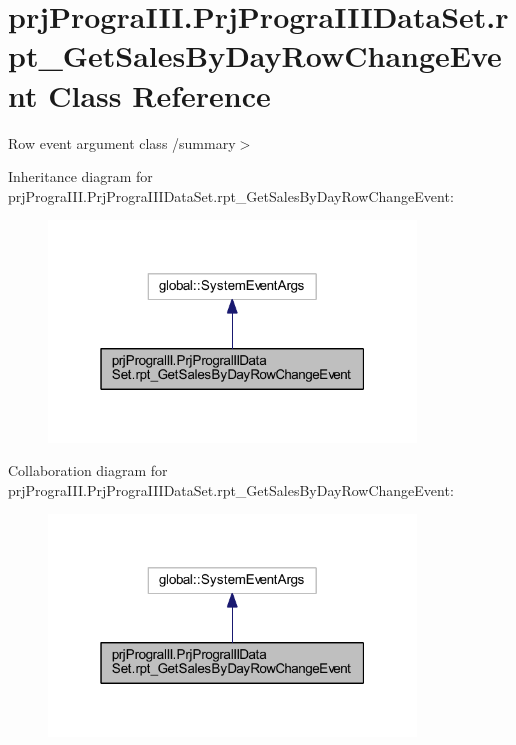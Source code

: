 \hypertarget{classprj_progra_i_i_i_1_1_prj_progra_i_i_i_data_set_1_1rpt___get_sales_by_day_row_change_event}{}\section{prj\+Progra\+I\+I\+I.\+Prj\+Progra\+I\+I\+I\+Data\+Set.\+rpt\+\_\+\+Get\+Sales\+By\+Day\+Row\+Change\+Event Class Reference}
\label{classprj_progra_i_i_i_1_1_prj_progra_i_i_i_data_set_1_1rpt___get_sales_by_day_row_change_event}


Row event argument class /summary$>$  




Inheritance diagram for prj\+Progra\+I\+I\+I.\+Prj\+Progra\+I\+I\+I\+Data\+Set.\+rpt\+\_\+\+Get\+Sales\+By\+Day\+Row\+Change\+Event\+:
\nopagebreak
\begin{figure}[H]
\begin{center}
\leavevmode
\includegraphics[width=277pt]{classprj_progra_i_i_i_1_1_prj_progra_i_i_i_data_set_1_1rpt___get_sales_by_day_row_change_event__inherit__graph}
\end{center}
\end{figure}


Collaboration diagram for prj\+Progra\+I\+I\+I.\+Prj\+Progra\+I\+I\+I\+Data\+Set.\+rpt\+\_\+\+Get\+Sales\+By\+Day\+Row\+Change\+Event\+:
\nopagebreak
\begin{figure}[H]
\begin{center}
\leavevmode
\includegraphics[width=277pt]{classprj_progra_i_i_i_1_1_prj_progra_i_i_i_data_set_1_1rpt___get_sales_by_day_row_change_event__coll__graph}
\end{center}
\end{figure}
